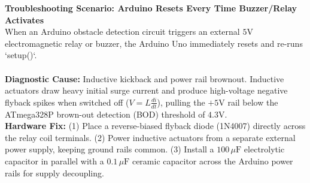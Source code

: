 \textbf{Troubleshooting Scenario: Arduino Resets Every Time Buzzer/Relay Activates}\\
When an Arduino obstacle detection circuit triggers an external $5\text{V}$ electromagnetic relay or buzzer, the Arduino Uno immediately resets and re-runs `setup()`.\\\\
\textbf{Diagnostic Cause:} Inductive kickback and power rail brownout. Inductive actuators draw heavy initial surge current and produce high-voltage negative flyback spikes when switched off ($V = L \frac{di}{dt}$), pulling the $+5\text{V}$ rail below the ATmega328P brown-out detection (BOD) threshold of $4.3\text{V}$.\\
\textbf{Hardware Fix:} (1) Place a reverse-biased flyback diode (1N4007) directly across the relay coil terminals. (2) Power inductive actuators from a separate external power supply, keeping ground rails common. (3) Install a $100\,\mu\mathrm{F}$ electrolytic capacitor in parallel with a $0.1\,\mu\mathrm{F}$ ceramic capacitor across the Arduino power rails for supply decoupling.
\vspace{4mm}
